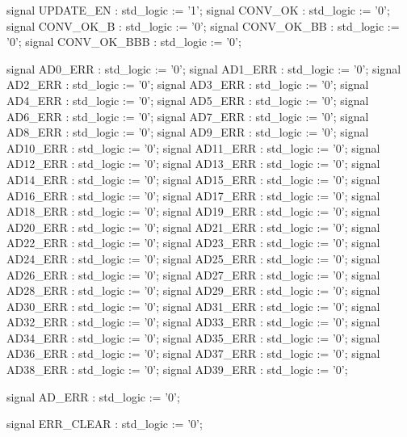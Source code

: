 \begin{mylisting}[language=VHDL,caption=AD変換モジュール,label=appF_ADC_module_VHDL]
	signal UPDATE_EN		: std_logic							:= '1';
	signal CONV_OK			: std_logic							:= '0';
	signal CONV_OK_B		: std_logic							:= '0';
	signal CONV_OK_BB		: std_logic							:= '0';
	signal CONV_OK_BBB		: std_logic							:= '0';


	signal AD0_ERR			: std_logic							:= '0';
	signal AD1_ERR			: std_logic							:= '0';
	signal AD2_ERR			: std_logic							:= '0';
	signal AD3_ERR			: std_logic							:= '0';
	signal AD4_ERR			: std_logic							:= '0';
	signal AD5_ERR			: std_logic							:= '0';
	signal AD6_ERR			: std_logic							:= '0';
	signal AD7_ERR			: std_logic							:= '0';
	signal AD8_ERR			: std_logic							:= '0';
	signal AD9_ERR			: std_logic							:= '0';
	signal AD10_ERR			: std_logic							:= '0';
	signal AD11_ERR			: std_logic							:= '0';
	signal AD12_ERR			: std_logic							:= '0';
	signal AD13_ERR			: std_logic							:= '0';
	signal AD14_ERR			: std_logic							:= '0';
	signal AD15_ERR			: std_logic							:= '0';
	signal AD16_ERR			: std_logic							:= '0';
	signal AD17_ERR			: std_logic							:= '0';
	signal AD18_ERR			: std_logic							:= '0';
	signal AD19_ERR			: std_logic							:= '0';
	signal AD20_ERR			: std_logic							:= '0';
	signal AD21_ERR			: std_logic							:= '0';
	signal AD22_ERR			: std_logic							:= '0';
	signal AD23_ERR			: std_logic							:= '0';
	signal AD24_ERR			: std_logic							:= '0';
	signal AD25_ERR			: std_logic							:= '0';
	signal AD26_ERR			: std_logic							:= '0';
	signal AD27_ERR			: std_logic							:= '0';
	signal AD28_ERR			: std_logic							:= '0';
	signal AD29_ERR			: std_logic							:= '0';
	signal AD30_ERR			: std_logic							:= '0';
	signal AD31_ERR			: std_logic							:= '0';
	signal AD32_ERR			: std_logic							:= '0';
	signal AD33_ERR			: std_logic							:= '0';
	signal AD34_ERR			: std_logic							:= '0';
	signal AD35_ERR			: std_logic							:= '0';
	signal AD36_ERR			: std_logic							:= '0';
	signal AD37_ERR			: std_logic							:= '0';
	signal AD38_ERR			: std_logic							:= '0';
	signal AD39_ERR			: std_logic							:= '0';
	
	signal AD_ERR			: std_logic							:= '0';
	
	signal ERR_CLEAR		: std_logic							:= '0';


\end{mylisting}
